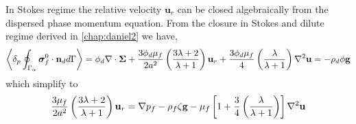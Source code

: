In Stokes regime the relative velocity $\textbf{u}_r$ can be closed algebraically from the dispersed phase momentum equation.  
From the closure in Stokes and dilute regime derived in \ref{chap:daniel2} we have, 
\begin{equation*}
    \left<\delta_{p} \oint_{\Gamma_{\alpha}} \bm{\sigma}_f^0\cdot \textbf{n}_d d\Gamma\right> = 
    \phi_d \mathbf{\nabla}\cdot\bm\Sigma
    + \frac{3\phi_d\mu_f}{2 a^2} 
    \left(\frac{3\lambda+2}{\lambda+1}\right) \textbf{u}_{r} 
    + \frac{3\phi_d\mu_f}{4} \left(\frac{\lambda}{\lambda+1}\right)\mathbf{\nabla}^2\textbf{u}
    = - 
    \rho_d \phi \textbf{g}
\end{equation*}
which simplify to 
\begin{align*}
    \frac{3\mu_f}{2 a^2}\left(\frac{3\lambda+2}{\lambda+1}\right)
   \textbf{u}_{r} 
    = 
    \mathbf{\nabla} p_f
    - \rho_f\zeta   \textbf{g}
    -  \mu_f \left[
        1 + \frac{3}{4} \left(\frac{\lambda}{\lambda+1}\right)
        \right]\mathbf{\nabla}^2 \textbf{u}
\end{align*}


